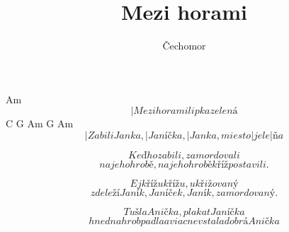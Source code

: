 \documentclass{song}
\title{Mezi horami}
\author{Čechomor}
\begin{document}
\strophe
   Am
\[ |Mezi horami lipka zelená \]
   C             G         Am            G    Am
\[ |Zabili Janka, |Janíčka, |Janka, miesto |jele|ňa \]
\endstrophe

\strophe*
\[ Keď ho zabili, zamordovali \]
\[ na jeho hrobě, na jeho hrobě kříž postavili. \]
\endstrophe

\strophe*
\[ Ej křížu křížu, ukřižovaný \]
\[ zde leží Janík, Janíček, Janík, zamordovaný. \]
\endstrophe

\strophe*
\[ Tu šla Anička, plakat Janíčka \]
\[ hned na hrob padla a viac nevstala dobrá Anička \]
\endstrophe
\end{document}
